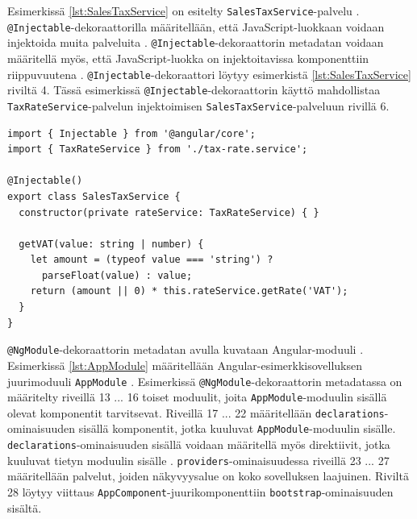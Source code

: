\documentclass[finnish]{tktltiki2}
\theoremstyle{definition}
\theoremstyle{remark}
\numberwithin{figure}{section}
\begin{document}
Esimerkissä \ref{lst:SalesTaxService} on esitelty \texttt{SalesTaxService}-palvelu \cite{ExampleApplication}. \texttt{@Injectable}-dekoraattorilla määritellään, että JavaScript-luokkaan voidaan injektoida muita palveluita \cite{ArchitectureServices}. \texttt{@Injectable}-dekoraattorin metadatan voidaan määritellä myös, että JavaScript-luokka on injektoitavissa komponenttiin riippuvuutena \cite{ArchitectureServices}. \texttt{@Injectable}-dekoraattori löytyy esimerkistä \ref{lst:SalesTaxService} riviltä 4. Tässä esimerkissä \texttt{@Injectable}-dekoraattorin käyttö mahdollistaa \texttt{TaxRateService}-palvelun injektoimisen \texttt{SalesTaxService}-palveluun rivillä 6.

\begin{lstlisting}[style=htmlcssjs, caption=SalesTaxService-palvelu \protect\cite{ExampleApplication}, label=lst:SalesTaxService ]
import { Injectable } from '@angular/core';
import { TaxRateService } from './tax-rate.service';

@Injectable()
export class SalesTaxService {
  constructor(private rateService: TaxRateService) { }

  getVAT(value: string | number) {
    let amount = (typeof value === 'string') ?
      parseFloat(value) : value;
    return (amount || 0) * this.rateService.getRate('VAT');
  }
}
\end{lstlisting}

\texttt{@NgModule}-dekoraattorin metadatan avulla kuvataan Angular-moduuli \cite{ArchitectureModules}. Esimerkissä \ref{lst:AppModule} määritellään Angular-esimerkkisovelluksen juurimoduuli \texttt{AppModule} \cite{ExampleApplication}. Esimerkissä \texttt{@NgModule}-dekoraattorin metadatassa on määritelty riveillä 13 ... 16 toiset moduulit, joita \texttt{AppModule}-moduulin sisällä olevat komponentit tarvitsevat. Riveillä 17 ... 22 määritellään \texttt{declarations}-ominaisuuden sisällä komponentit, jotka kuuluvat \texttt{AppModule}-moduulin sisälle. \texttt{declarations}-ominaisuuden sisällä voidaan määritellä myös direktiivit, jotka kuuluvat tietyn moduulin sisälle \cite{ArchitectureModules}. \texttt{providers}-ominaisuudessa riveillä 23 ... 27 määritellään palvelut, joiden näkyvyysalue on koko sovelluksen laajuinen. Riviltä 28 löytyy viittaus \texttt{AppComponent}-juurikomponenttiin \texttt{bootstrap}-ominaisuuden sisältä.
\end{document}
